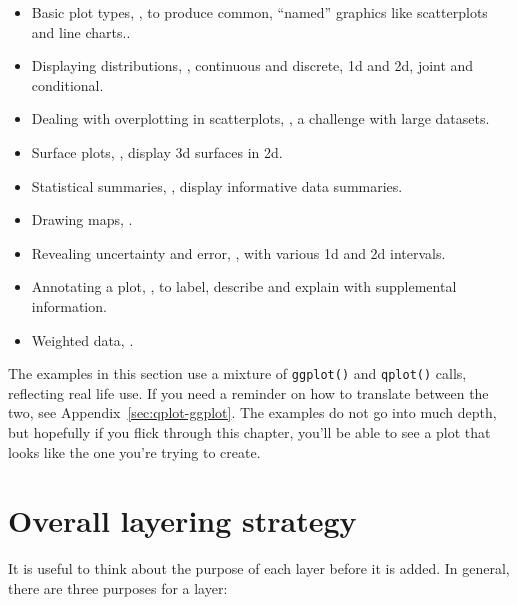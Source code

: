 \begin{itemize}
  \item Basic plot types, , to produce common, ``named'' graphics like scatterplots and line charts..
  
  \item Displaying distributions, , continuous and discrete, 1d and 2d, joint and conditional.
  
  \item Dealing with overplotting in scatterplots, , a challenge with large datasets.

  \item Surface plots, , display 3d surfaces in 2d.

  \item Statistical summaries, , display informative data summaries.

  \item Drawing maps, .

  \item Revealing uncertainty and error, , with various 1d and 2d intervals.

  \item Annotating a plot, , to label, describe and explain with supplemental information.

  \item Weighted data, .
\end{itemize}

The examples in this section use a mixture of {\tt ggplot()} and {\tt qplot()} calls, reflecting real life use.  If you need a reminder on how to translate between the two, see Appendix~\ref{sec:qplot-ggplot}.  The examples do not go into much depth, but hopefully if you flick through this chapter, you'll be able to see a plot that looks like the one you're trying to create.

\section{Overall layering strategy}
\label{sec:strategy}

It is useful to think about the purpose of each layer before it is added.  In general, there are three purposes for a layer:


